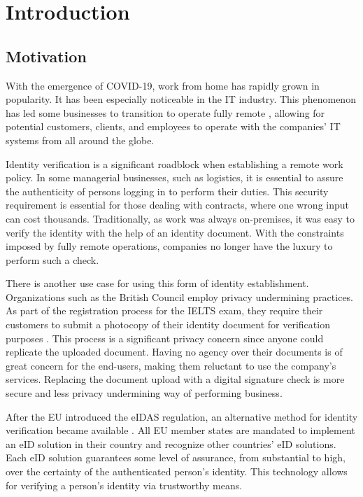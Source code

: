 \section{Introduction}

\subsection{Motivation}

With the emergence of COVID-19, work from home has rapidly grown in popularity. It has been especially noticeable in the IT industry. This phenomenon has led some businesses to transition to operate fully remote \cite{ozimek2020future}, allowing for potential customers, clients, and employees to operate with the companies' IT systems from all around the globe.

Identity verification is a significant roadblock when establishing a remote work policy. In some managerial businesses, such as logistics, it is essential to assure the authenticity of persons logging in to perform their duties. This security requirement is essential for those dealing with contracts, where one wrong input can cost thousands. Traditionally, as work was always on-premises, it was easy to verify the identity with the help of an identity document. With the constraints imposed by fully remote operations, companies no longer have the luxury to perform such a check.

There is another use case for using this form of identity establishment. Organizations such as the British Council employ privacy undermining practices. As part of the registration process for the IELTS exam, they require their customers to submit a photocopy of their identity document for verification purposes \cite{ielts-howtoregister}. This process is a significant privacy concern since anyone could replicate the uploaded document. Having no agency over their documents is of great concern for the end-users, making them reluctant to use the company's services. Replacing the document upload with a digital signature check is more secure and less privacy undermining way of performing business.

After the EU introduced the eIDAS regulation, an alternative method for identity verification became available \cite{eulaw-eidas}. All EU member states are mandated to implement an eID solution in their country and recognize other countries' eID solutions. Each eID solution guarantees some {level of assurance}, from substantial to high, over the certainty of the authenticated person's identity. This technology allows for verifying a person's identity via trustworthy means.

